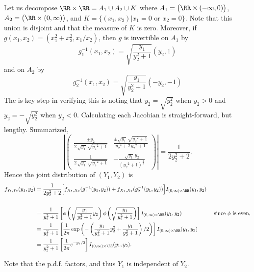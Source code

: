 \documentclass{homework}
\begin{document}
Let us decompose $\RR \times \RR = A_1\cup A_2 \cup K$ where $A_1 = \big(\RR\times(-\infty,0)\big)$, $ A_2 = \big(\RR \times (0,\infty)\big)$, and  $K=\{(x_1,x_2)|x_1 = 0\text{ or }x_2=0\}$. Note that this union is disjoint and that the measure of $K$ is zero. Moreover, if $ g(x_1,x_2) = (x_1^2 + x_2^2, x_1/x_2) $, then $g$ is invertible on $A_1$ by
  $$ g_1^{-1}(x_1,x_2) = \sqrt{\frac{y_1}{y_2^2 +1}} (y_2,1) $$
and on $A_2$ by
  $$ g_2^{-1}(x_1,x_2) = \sqrt{\frac{y_1}{y_2^2 +1}} (-y_2,-1) $$
The is key step in verifying this is noting that $y_2 = \sqrt{y_2^2}$ when $y_2>0$ and $y_2 = -\sqrt{y_2^2}$ when $y_2<0$. Calculating each Jacobian is straight-forward, but lengthy.  Summarized,
$$
\left|
\begin{pmatrix}
  \frac{\pm y_2}{2\,\sqrt{y_1}\,\sqrt{{y_2}^{2}+1}} & 
  \frac{\pm \sqrt{y_1}\,\sqrt{{y_2}^{2}+1}}{{y_2}^{4}+2\,{y_2}^{2}+1}\\ 
  \frac{1}{2\,\sqrt{y_1}\,\sqrt{{y_2}^{2}+1}} &
   -\frac{\sqrt{y_1}\,y_2}{{\left( {y_2}^{2}+1\right) }^{\frac{3}{2}}}\end{pmatrix}\right|
= \frac{1}{2y_2^2 + 2}.
$$
Hence the joint distribution of $(Y_1,Y_2)$ is 
\begin{align*}
  f_{Y_1,Y_2}(y_1,y_2) 
  &= \frac{1}{2y_2^2 + 2} \Big[f_{X_1,X_2}(g_1^{-1}(y_1,y_2)) + f_{X_1,X_2}(g_2^{-1}(y_1,y_2))\Big]I_{(0,\infty)\times\RR}(y_1,y_2)\\
\\
  &= \frac{1}{y_2^2 + 1} \left[ \phi \left( \sqrt{\frac{y_1}{y_2^2+1}}y_2 \right) \phi \left( \sqrt{\frac{y_1}{y_2^2+1}} \right) \right] 
  I_{(0,\infty)\times\RR}(y_1,y_2) & \text{ since $\phi$ is even,}\\
  &= \frac{1}{y_2^2 + 1} \left[ \frac{1}{2\pi}\exp \left(-\left( \frac{y_1}{y_2^2+1}y_2^2 + \frac{y_1}{y_2^2+1} \right)/2 \right)\right] I_{(0,\infty)\times\RR}(y_1,y_2)\\
  &= \frac{1}{y_2^2 + 1} \left[ \frac{1}{2\pi}e^{- y_1 /2}\right] I_{(0,\infty)\times\RR}(y_1,y_2).\\
\end{align*}

Note that the p.d.f. factors, and thus $Y_1$ is independent of $Y_2$.
\end{document}
